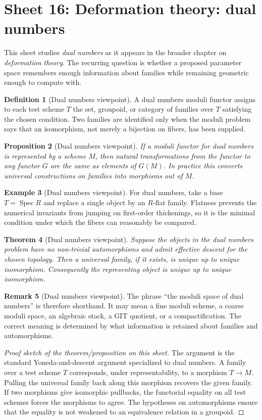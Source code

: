\documentclass[11pt]{amsart}
\newtheorem{theorem}{Theorem}[section]
\newtheorem{proposition}[theorem]{Proposition}
\theoremstyle{definition}
\newtheorem{definition}[theorem]{Definition}
\newtheorem{example}[theorem]{Example}
\newtheorem{remark}[theorem]{Remark}
\newcommand{\Spec}{\operatorname{Spec}}
\begin{document}
\section{Sheet 16: Deformation theory: dual numbers}
This sheet studies \emph{dual numbers} as it appears in the broader chapter on \emph{deformation theory}.  The recurring question is whether a proposed parameter space remembers enough information about families while remaining geometric enough to compute with.
\begin{definition}[Dual numbers viewpoint]
A dual numbers moduli functor assigns to each test scheme $T$ the set, groupoid, or category of families over $T$ satisfying the chosen condition.  Two families are identified only when the moduli problem says that an isomorphism, not merely a bijection on fibers, has been supplied.
\end{definition}
\begin{proposition}[Dual numbers viewpoint]
If a moduli functor for dual numbers is represented by a scheme $M$, then natural transformations from the functor to any functor $G$ are the same as elements of $G(M)$.  In practice this converts universal constructions on families into morphisms out of $M$.
\end{proposition}
\begin{example}[Dual numbers viewpoint]
For dual numbers, take a base $T=\Spec R$ and replace a single object by an $R$-flat family.  Flatness prevents the numerical invariants from jumping on first-order thickenings, so it is the minimal condition under which the fibers can reasonably be compared.
\end{example}
\begin{theorem}[Dual numbers viewpoint]
Suppose the objects in the dual numbers problem have no non-trivial automorphisms and admit effective descent for the chosen topology.  Then a universal family, if it exists, is unique up to unique isomorphism.  Consequently the representing object is unique up to unique isomorphism.
\end{theorem}
\begin{remark}[Dual numbers viewpoint]
The phrase ``the moduli space of dual numbers'' is therefore shorthand.  It may mean a fine moduli scheme, a coarse moduli space, an algebraic stack, a GIT quotient, or a compactification.  The correct meaning is determined by what information is retained about families and automorphisms.
\end{remark}
\begin{proof}[Proof sketch of the theorem/proposition on this sheet]
The argument is the standard Yoneda-and-descent argument specialized to dual numbers.  A family over a test scheme $T$ corresponds, under representability, to a morphism $T\to M$.  Pulling the universal family back along this morphism recovers the given family.  If two morphisms give isomorphic pullbacks, the functorial equality on all test schemes forces the morphisms to agree.  The hypotheses on automorphisms ensure that the equality is not weakened to an equivalence relation in a groupoid.
\end{proof}
\end{document}
